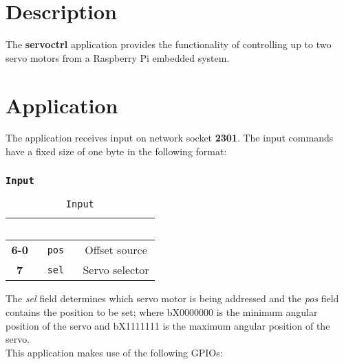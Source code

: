 \section{Description}
The \textbf{servoctrl} application provides the functionality of controlling up
to two servo motors from a Raspberry Pi embedded system.

\section{Application}
The application receives input on network socket \textbf{2301}. The input
commands have a fixed size of one byte in the following format:

   \subsubsection{\texttt{Input}}
   \begin{table}[!htb]
      \begin{center}
         \begin{tabular}{|c|c|c|}
            \rowcolor{black}
            \textcolor{white}{\textbf{Bit}}  &
            \textcolor{white}{\textbf{Name}} &
            \textcolor{white}{\textbf{Description}}\\
            \hline
            \hline
            \textbf{6-0} & \texttt{pos} & Offset source \\
            \hline
            \textbf{7}   & \texttt{sel} & Servo selector \\
            \hline
         \end{tabular}
         \caption{\texttt{Input}}
         \label{table:input}
      \end{center}
   \end{table}

The \textit{sel} field determines which servo motor is being addressed and the
\textit{pos} field contains the position to be set; where bX0000000 is the
minimum angular position of the servo and bX1111111 is the maximum angular
position of the servo.\\

This application makes use of the following GPIOs:

